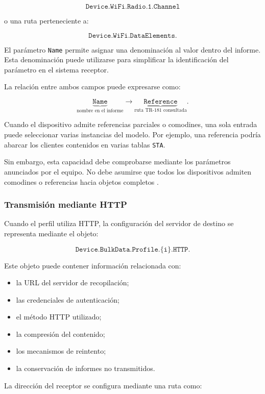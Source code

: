 \[
    \texttt{Device.WiFi.Radio.1.Channel}
\]

o una ruta perteneciente a:

\[
    \texttt{Device.WiFi.DataElements.}
\]

El parámetro \texttt{Name} permite asignar una denominación al valor
dentro del informe. Esta denominación puede utilizarse para simplificar
la identificación del parámetro en el sistema receptor.

La relación entre ambos campos puede expresarse como:

\[
    \underbrace{\texttt{Name}}_{\text{nombre en el informe}}
    \longrightarrow
    \underbrace{\texttt{Reference}}_{\text{ruta TR-181 consultada}}.
\]

Cuando el dispositivo admite referencias parciales o comodines, una sola
entrada puede seleccionar varias instancias del modelo. Por ejemplo, una
referencia podría abarcar los clientes contenidos en varias tablas
\texttt{STA}.

Sin embargo, esta capacidad debe comprobarse mediante los parámetros
anunciados por el equipo. No debe asumirse que todos los dispositivos
admiten comodines o referencias hacia objetos completos
\cite{bbf_tr181}.


\subsubsection*{Transmisión mediante HTTP}

Cuando el perfil utiliza HTTP, la configuración del servidor de destino
se representa mediante el objeto:

\[
    \texttt{Device.BulkData.Profile.\{i\}.HTTP.}
\]

Este objeto puede contener información relacionada con:

\begin{itemize}
    \item la URL del servidor de recopilación;
    \item las credenciales de autenticación;
    \item el método HTTP utilizado;
    \item la compresión del contenido;
    \item los mecanismos de reintento;
    \item la conservación de informes no transmitidos.
\end{itemize}

La dirección del receptor se configura mediante una ruta como:

